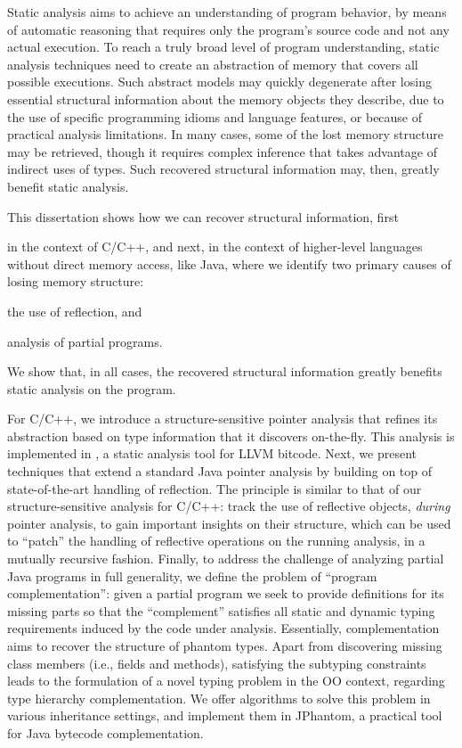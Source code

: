 
Static analysis aims to achieve an understanding of program behavior,
by means of automatic reasoning that requires only the program's
source code and not any actual execution. To reach a truly broad level
of program understanding, static analysis techniques need to create an
abstraction of memory that covers all possible executions. Such
abstract models may quickly degenerate after losing essential
structural information about the memory objects they describe, due to
the use of specific programming idioms and language features, or
because of practical analysis limitations. In many cases, some of the
lost memory structure may be retrieved, though it requires complex
inference that takes advantage of indirect uses of types. Such
recovered structural information may, then, greatly benefit static
analysis.

This dissertation shows how we can recover structural information,
first
\begin{inparaenum}[(i)]
\item in the context of C/C++, and next, in the context of
  higher-level languages without direct memory access, like Java,
  where we identify two primary causes of losing memory structure:
\item the use of reflection, and
\item analysis of partial programs.
\end{inparaenum}
We show that, in all cases, the recovered structural information
greatly benefits static analysis on the program.

For C/C++, we introduce a structure-sensitive pointer analysis that
refines its abstraction based on type information that it discovers
on-the-fly. This analysis is implemented in \cclyzer{}, a static
analysis tool for LLVM bitcode.
%
Next, we present techniques that extend a standard Java pointer
analysis by building on top of state-of-the-art handling of
reflection. The principle is similar to that of our
structure-sensitive analysis for C/C++: track the use of reflective
objects, \emph{during} pointer analysis, to gain important insights on
their structure, which can be used to ``patch'' the handling of
reflective operations on the running analysis, in a mutually recursive
fashion.
%
Finally, to address the challenge of analyzing partial Java programs
in full generality, we define the problem of ``program
complementation'': given a partial program we seek to provide
definitions for its missing parts so that the ``complement'' satisfies
all static and dynamic typing requirements induced by the code under
analysis. Essentially, complementation aims to recover the structure
of phantom types.  Apart from discovering missing class members (i.e.,
fields and methods), satisfying the subtyping constraints leads to the
formulation of a novel typing problem in the OO context, regarding
type hierarchy complementation. We offer algorithms to solve this
problem in various inheritance settings, and implement them in
JPhantom, a practical tool for Java bytecode complementation.


